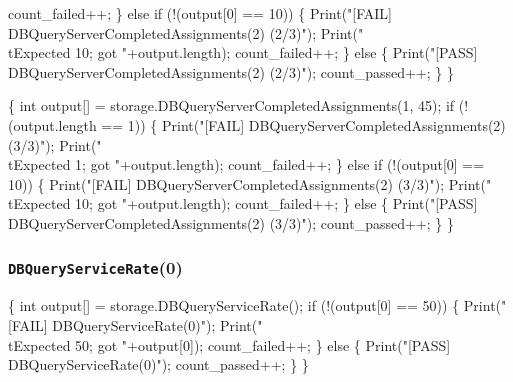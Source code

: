 \documentclass{article}
\def\nwendcode{\endtrivlist \endgroup}
\let\nwdocspar=\par
\begin{document}
    count_failed++;
  \} else if (!(output[0] == 10)) \{
    Print("[FAIL] DBQueryServerCompletedAssignments(2) (2/3)");
    Print("\\tExpected 10; got "+output.length);
    count_failed++;
  \} else \{
    Print("[PASS] DBQueryServerCompletedAssignments(2) (2/3)");
    count_passed++;
  \}
\}
\nwendcode{}\nwdocspar
\nwenddocs{}\endmoddef{}
\{
  int output[] = storage.DBQueryServerCompletedAssignments(1, 45);
  if (!(output.length == 1)) \{
    Print("[FAIL] DBQueryServerCompletedAssignments(2) (3/3)");
    Print("\\tExpected 1; got "+output.length);
    count_failed++;
  \} else if (!(output[0] == 10)) \{
    Print("[FAIL] DBQueryServerCompletedAssignments(2) (3/3)");
    Print("\\tExpected 10; got "+output.length);
    count_failed++;
  \} else \{
    Print("[PASS] DBQueryServerCompletedAssignments(2) (3/3)");
    count_passed++;
  \}
\}
\nwendcode{}\nwdocspar
\subsubsection{{\tt{}DBQueryServiceRate}(0)}
\nwenddocs{}\endmoddef{}
\{
  int output[] = storage.DBQueryServiceRate();
  if (!(output[0] == 50)) \{
    Print("[FAIL] DBQueryServiceRate(0)");
    Print("\\tExpected 50; got "+output[0]);
    count_failed++;
  \} else \{
    Print("[PASS] DBQueryServiceRate(0)");
    count_passed++;
  \}
\}
\nwendcode{}\nwdocspar
\end{document}
